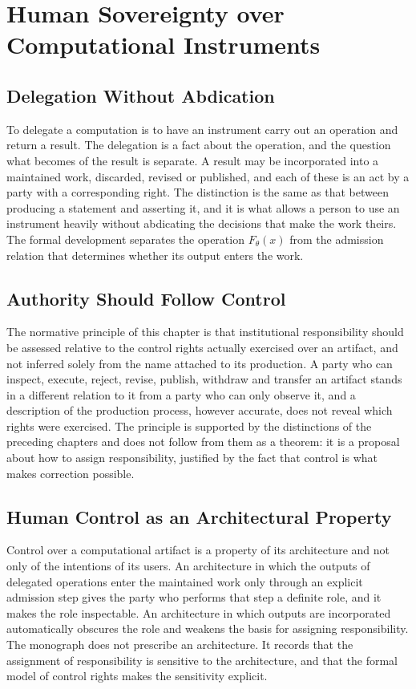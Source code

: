 \documentclass[11pt,letterpaper]{report}
\theoremstyle{plain}
\theoremstyle{definition}
\theoremstyle{remark}
\begin{document}
\chapter{Human Sovereignty over Computational Instruments}

\section{Delegation Without Abdication}

To delegate a computation is to have an instrument carry out an operation and return a result. The delegation is a fact about the operation, and the question what becomes of the result is separate. A result may be incorporated into a maintained work, discarded, revised or published, and each of these is an act by a party with a corresponding right. The distinction is the same as that between producing a statement and asserting it, and it is what allows a person to use an instrument heavily without abdicating the decisions that make the work theirs. The formal development separates the operation $F_\theta(x)$ from the admission relation that determines whether its output enters the work.

\section{Authority Should Follow Control}

The normative principle of this chapter is that institutional responsibility should be assessed relative to the control rights actually exercised over an artifact, and not inferred solely from the name attached to its production. A party who can inspect, execute, reject, revise, publish, withdraw and transfer an artifact stands in a different relation to it from a party who can only observe it, and a description of the production process, however accurate, does not reveal which rights were exercised. The principle is supported by the distinctions of the preceding chapters and does not follow from them as a theorem: it is a proposal about how to assign responsibility, justified by the fact that control is what makes correction possible.

\section{Human Control as an Architectural Property}

Control over a computational artifact is a property of its architecture and not only of the intentions of its users. An architecture in which the outputs of delegated operations enter the maintained work only through an explicit admission step gives the party who performs that step a definite role, and it makes the role inspectable. An architecture in which outputs are incorporated automatically obscures the role and weakens the basis for assigning responsibility. The monograph does not prescribe an architecture. It records that the assignment of responsibility is sensitive to the architecture, and that the formal model of control rights makes the sensitivity explicit.
\end{document}
